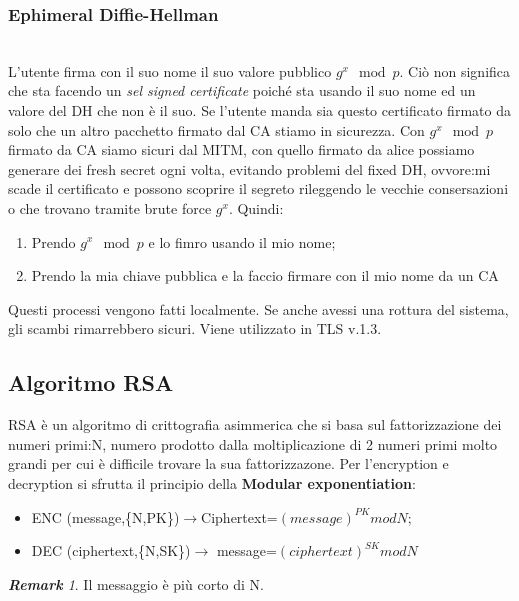 \documentclass{book}
\theoremstyle{remark}
\newtheorem*{remark}{\textbf{Remark}}
\begin{document}
\subsubsection{Ephimeral Diffie-Hellman}\mbox{}\\
L'utente firma con il suo nome il suo valore pubblico \(g^x \mod{p}\)\@. Ciò non significa che sta facendo un \emph{sel signed certificate} poiché sta usando il suo nome ed un valore del DH che non è il suo\@. Se l'utente manda sia questo certificato firmato da solo che un altro pacchetto firmato dal CA stiamo in sicurezza\@. \newline
Con \(g^x \mod{p}\) firmato da CA siamo sicuri dal MITM, con quello firmato da alice possiamo generare dei fresh secret ogni volta, evitando problemi del fixed DH, ovvore:\@o mi scade il certificato e possono scoprire il segreto rileggendo le vecchie consersazioni o che trovano tramite brute force \(g^x\)\@. Quindi:\begin{enumerate}
	\item Prendo \(g^x \mod{p}\) e lo fimro usando il mio nome;\@
	\item Prendo la mia chiave pubblica e la faccio firmare con il mio nome da un CA
\end{enumerate}
Questi processi vengono fatti localmente\@. Se anche avessi una rottura del sistema, gli scambi rimarrebbero sicuri\@. Viene utilizzato in TLS v\@.1\@.3\@.
\subsection{Algoritmo RSA}
RSA è un algoritmo di crittografia asimmerica che si basa sul fattorizzazione dei numeri primi:\@dato N, numero prodotto dalla moltiplicazione di 2 numeri primi molto grandi per cui è difficile trovare la sua fattorizzazone\@.
Per l'encryption e decryption si sfrutta il principio della \textbf{Modular exponentiation}:\begin{itemize}
	\item ENC (message,\{N,PK\})\(\rightarrow\)Ciphertext=\((message)^{PK} mod N\);\@
	\item DEC (ciphertext,\{N,SK\})\(\rightarrow \) message=\((ciphertext)^{SK} mod N\)
\end{itemize}
\begin{remark}
	Il messaggio è più corto di N\@.
\end{remark}
\end{document}
